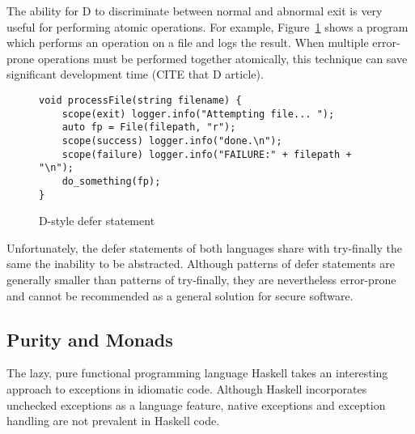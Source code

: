 \documentclass[11pt]{article}
\newcommand{\maybePage}{\newpage}
\begin{document}
The ability for D to discriminate between normal and abnormal exit is very useful for performing atomic operations.
For example, Figure~\ref{Dscope} shows a program which performs an operation on a file and logs the result.
When multiple error-prone operations must be performed together atomically, this technique can save significant development time (CITE that D article).

\begin{figure}[H]
\caption{D-style defer statement}
\label{Dscope}

\begin{verbatim}
void processFile(string filename) {
    scope(exit) logger.info("Attempting file... ");
    auto fp = File(filepath, "r");
    scope(success) logger.info("done.\n");
    scope(failure) logger.info("FAILURE:" + filepath + "\n");
    do_something(fp);
}
\end{verbatim}

\end{figure}

Unfortunately, the defer statements of both languages share with try-finally the same the inability to be abstracted.
Although patterns of defer statements are generally smaller than patterns of try-finally, they are nevertheless error-prone and cannot be recommended as a general solution for secure software.




\maybePage
\subsection{Purity and Monads}
\label{subsect:exceptionMonads}
The lazy, pure functional programming language Haskell takes an interesting approach to exceptions in idiomatic code.
Although Haskell incorporates unchecked exceptions as a language feature, native exceptions and exception handling are not prevalent in Haskell code.
\end{document}
